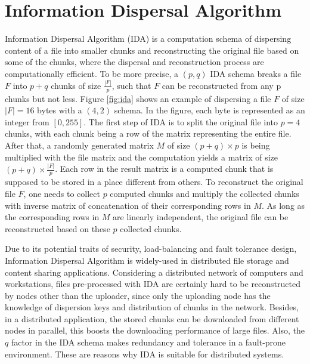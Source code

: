 \section{Information Dispersal Algorithm}
\label{s:informationdispersalalgorithm}

Information Dispersal Algorithm (IDA)\cite{rabin1989efficient} is a computation schema of dispersing content of a file into smaller chunks and reconstructing the original file based on some of the chunks, where the dispersal and reconstruction process are computationally efficient. To be more precise, a $(p,q)$ IDA schema breaks a file $F$ into $p + q$ chunks of size $\frac{|F|}{p}$, such that $F$ can be reconstructed from any p chunks but not less. Figure \ref{fig:ida} shows an example of dispersing a file $F$ of size $|F|=16$ bytes with a $(4,2)$ schema. In the figure, each byte is represented as an integer from $[0, 255]$. The first step of IDA is to split the original file into $p=4$ chunks, with each chunk being a row of the matrix representing the entire file. After that, a randomly generated matrix $M$ of size $(p+q)\times p$ is being multiplied with the file matrix and the computation yields a matrix of size $(p+q)\times \frac{|F|}{p}$. Each row in the result matrix is a computed chunk that is supposed to be stored in a place different from others. To reconstruct the original file $F$, one needs to collect $p$ computed chunks and multiply the collected chunks with inverse matrix of concatenation of their corresponding rows in $M$. As long as the corresponding rows in $M$ are linearly independent, the original file can be reconstructed based on these $p$ collected chunks.

Due to its potential traits of security, load-balancing and fault tolerance design, Information Dispersal Algorithm is widely-used in distributed file storage and content sharing applications. Considering a distributed network of computers and workstations, files pre-processed with IDA are certainly hard to be reconstructed by nodes other than the uploader, since only the uploading node has the knowledge of dispersion keys and distribution of chunks in the network. Besides, in a distributed application, the stored chunks can be downloaded from different nodes in parallel, this boosts the downloading performance of large files.  Also, the $q$ factor in the IDA schema makes redundancy and tolerance in a fault-prone environment. These are reasons why IDA is suitable for distributed systems.

